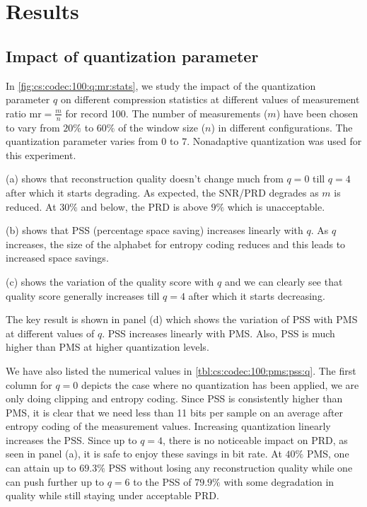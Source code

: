 \section{Results}
\label{sec:results}

\subsection{Impact of quantization parameter}
In \cref{fig:cs:codec:100:q:mr:stats}, we study
the impact of the quantization parameter $q$
on different compression statistics at different
values of measurement ratio $\text{mr}= \frac{m}{n}$
for record 100.
The number of measurements ($m$) have been chosen to vary from
$20\%$ to $60\%$ of the window size ($n$) in different configurations.
The quantization parameter varies from $0$ to $7$.
Nonadaptive quantization was used for this experiment.

(a) shows that reconstruction quality doesn't
change much from $q=0$ till $q=4$ after which it starts degrading.
As expected, the SNR/PRD degrades as $m$ is reduced.
At $30\%$ and below, the PRD is above $9\%$ which is unacceptable.

(b) shows that PSS (percentage space saving) increases linearly
with $q$. As $q$ increases, the size of the alphabet for
entropy coding reduces and this leads to increased space savings.

(c) shows the variation of the quality score with $q$ and we
can clearly see that quality score generally increases till
$q=4$ after which it starts decreasing.

The key result is shown in panel (d) which shows the variation
of PSS with PMS at different values of $q$.
PSS increases linearly with PMS. Also, PSS is much higher
than PMS at higher quantization levels.

We have also listed the numerical values in
\cref{tbl:cs:codec:100:pms:pss:q}.
The first column for $q=0$ depicts the case
where no quantization has been applied,
we are only doing clipping and entropy coding.
Since PSS is consistently higher than PMS,
it is clear that we need less than 11 bits per sample
on an average after entropy coding of the measurement
values. Increasing quantization linearly increases
the PSS. Since up to $q=4$, there is no noticeable
impact on PRD, as seen in panel (a), it is safe
to enjoy these savings in bit rate. 
At $40\%$ PMS, one can attain up to $69.3\%$ PSS without
losing any reconstruction quality while one can push
further up to $q=6$ to the PSS of $79.9\%$ with some
degradation in quality while still staying under
acceptable PRD. 
 


